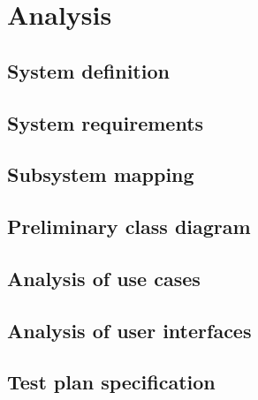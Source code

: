 \renewcommand{\documentname}{Analysis}

\chapter{Analysis}


\section{System definition}

\section{System requirements}

\section{Subsystem mapping}

\section{Preliminary class diagram}

\section{Analysis of use cases}

\section{Analysis of user interfaces}

\section{Test plan specification}

